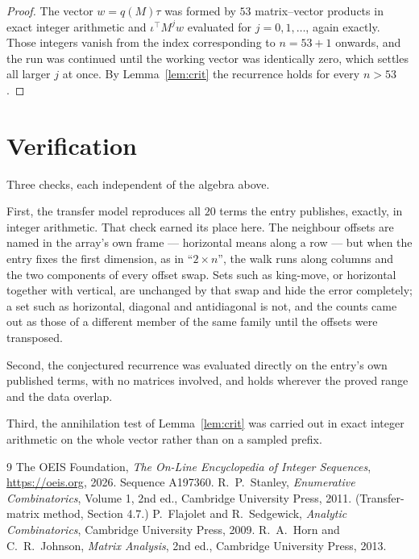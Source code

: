 \documentclass[11pt,a4paper]{article}
\theoremstyle{plain}
\theoremstyle{definition}
\begin{document}
\begin{proof}
The vector $w=q(M)\tau$ was formed by $53$ matrix--vector products in exact integer
arithmetic and $\iota^{\!\top}M^{j}w$ evaluated for $j=0,1,\dots$, again exactly. Those
integers vanish from the index corresponding to $n=53+1$ onwards, and the run was
continued until the working vector was identically zero, which settles all larger $j$ at once.
By Lemma~\ref{lem:crit} the recurrence holds for every $n>53$.
\end{proof}

\section{Verification}

Three checks, each independent of the algebra above.

First, the transfer model reproduces all $20$ terms the entry publishes, exactly, in
integer arithmetic. That check earned its place here. The neighbour offsets are named in the
array's own frame --- horizontal means along a row --- but when the entry fixes the first
dimension, as in ``$2\times n$'', the walk runs along columns and the two components of every
offset swap. Sets such as king-move, or horizontal together with vertical, are unchanged by
that swap and hide the error completely; a set such as horizontal, diagonal and antidiagonal
is not, and the counts came out as those of a different member of the same family until the
offsets were transposed.

Second, the conjectured recurrence was evaluated directly on the entry's own published terms,
with no matrices involved, and holds wherever the proved range and the data overlap.

Third, the annihilation test of Lemma~\ref{lem:crit} was carried out in exact integer
arithmetic on the whole vector rather than on a sampled prefix.

\begin{thebibliography}{9}
 The OEIS Foundation, \emph{The On-Line Encyclopedia of Integer
Sequences}, \url{https://oeis.org}, 2026. Sequence A197360.
 R.~P.~Stanley, \emph{Enumerative Combinatorics}, Volume 1, 2nd ed.,
Cambridge University Press, 2011. (Transfer-matrix method, Section 4.7.)
 P.~Flajolet and R.~Sedgewick, \emph{Analytic Combinatorics}, Cambridge
University Press, 2009.
 R.~A.~Horn and C.~R.~Johnson, \emph{Matrix Analysis}, 2nd ed., Cambridge
University Press, 2013.
\end{thebibliography}
\end{document}
